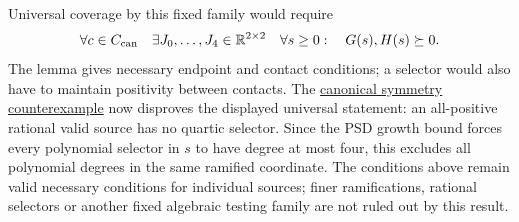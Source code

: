 \documentclass[11pt]{article}
\newcommand{\R}{\mathbb R}
\begin{document}
Universal coverage by this fixed family would require
\[
 \forall c\in C_{\rm can}\quad\exists J_0,\ldots,J_4\in\R^{2\times2}
 \quad\forall s\ge0:\quad G(s),H(s)\succeq0.
\]
The lemma gives necessary endpoint and contact conditions; a selector
would also have to maintain positivity between contacts. The
\href{../ramified-obstruction/Q222_Ramified_Quartic_Obstruction.pdf}{canonical symmetry counterexample}
now disproves the displayed universal statement: an all-positive rational
valid source has no quartic selector. Since the PSD growth bound forces
every polynomial selector in $s$ to have degree at most four, this excludes
all polynomial degrees in the same ramified coordinate. The conditions
above remain valid necessary conditions for individual sources; finer
ramifications, rational selectors or another fixed algebraic testing
family are not ruled out by this result.
\end{document}
